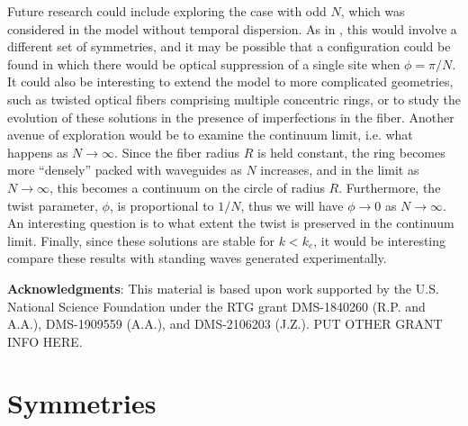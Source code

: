 \documentclass[11pt,reqno]{amsart}
\begin{document}
Future research could include exploring the case with odd $N$, which was considered in the model without temporal dispersion. As in \cite{parker2021}, this would involve a different set of symmetries, and it may be possible that a configuration could be found in which there would be optical suppression of a single site when $\phi = \pi/N$. It could also be interesting to extend the model to more complicated geometries, such as twisted optical fibers comprising multiple concentric rings, or to study the evolution of these solutions in the presence of imperfections in the fiber. Another avenue of exploration would be to examine the continuum limit, i.e. what happens as $N \rightarrow \infty$. Since the fiber radius $R$ is held constant, the ring becomes more ``densely'' packed with waveguides as $N$ increases, and in the limit as $N \rightarrow \infty$, this becomes a continuum on the circle of radius $R$. Furthermore, the twist parameter, $\phi$, is proportional to $1/N$, thus we will have $\phi \rightarrow 0$ as $N \rightarrow \infty$. An interesting question is to what extent the twist is preserved in the continuum limit. Finally, since these solutions are stable for $k < k_e$, it would be interesting compare these results with standing waves generated experimentally.

\vspace{0.5cm}
\textbf{Acknowledgments}: 
This material is based upon work supported by the U.S. National Science Foundation under the RTG grant DMS-1840260 (R.P. and A.A.), DMS-1909559 (A.A.), and DMS-2106203 (J.Z.). PUT OTHER GRANT INFO HERE.

\appendix

\section{Symmetries}\label{app:symm}
\end{document}
